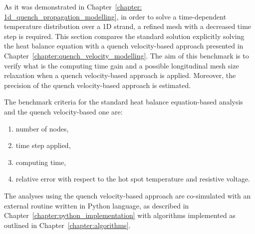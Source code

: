 
As it was demonstrated in Chapter~\ref{chapter: 1d_quench_propagation_modelling}, in order to solve a time-dependent temperature distribution over a 1D strand, a refined mesh with a decreased time step is required. This section compares the standard solution explicitly solving the heat balance equation with a quench velocity-based approach presented in Chapter~\ref{chapter:quench_velocity_modelling}. The aim of this benchmark is to verify what is the computing time gain and a possible longitudinal mesh size relaxation when a quench velocity-based approach is applied. Moreover, the precision of the quench velocity-based approach is estimated. 

The benchmark criteria for the standard heat balance equation-based analysis and the quench velocity-based one are: 
\begin{enumerate}
    \item number of nodes,
    \item time step applied,
    \item computing time,
    \item relative error with respect to the hot spot temperature and resistive voltage.
\end{enumerate}

The analyses using the quench velocity-based approach are co-simulated with an external routine written in Python language, as described in Chapter~\ref{chapter:python_implementation} with algorithms implemented as outlined in Chapter~\ref{chapter:algorithms}.

